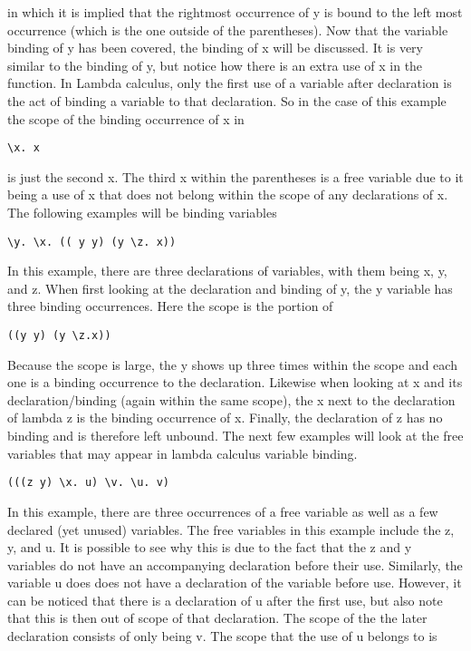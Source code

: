 \documentclass{article}
\begin{document}
in which it is implied that the rightmost occurrence of y is bound to the left most occurrence (which is the one outside of the parentheses).
Now that the variable binding of y has been covered, the binding of x will be discussed.
It is very similar to the binding of y, but notice how there is an extra use of x in the function.
In Lambda calculus, only the first use of a variable after declaration is the act of binding a variable to that declaration. So in the case of this example the scope of the binding occurrence of x in
\begin{lstlisting}
\x. x
\end{lstlisting}
is just the second x.
The third x within the parentheses is a free variable due to it being a use of x that does not belong within the scope of any declarations of x.
The following examples will be binding variables
\begin{lstlisting}
\y. \x. (( y y) (y \z. x))
\end{lstlisting}
In this example, there are three declarations of variables, with them being x, y, and z.
When first looking at the declaration and binding of y, the y variable has three binding occurrences.
Here the scope is the portion of 
\begin{lstlisting}
((y y) (y \z.x))
\end{lstlisting}
Because the scope is large, the y shows up three times within the scope and each one is a binding occurrence to the declaration.
Likewise when looking at x and its declaration/binding (again within the same scope), the x next to the declaration of lambda z is the binding occurrence of x.
Finally, the declaration of z has no binding and is therefore left unbound.
The next few examples will look at the free variables that may appear in lambda calculus variable binding.
\begin{lstlisting}
(((z y) \x. u) \v. \u. v)
\end{lstlisting}
In this example, there are three occurrences of a free variable as well as a few declared (yet unused) variables.
The free variables in this example include the z, y, and u.
It is possible to see why this is due to the fact that the z and y variables do not have an accompanying declaration before their use.
Similarly, the variable u does does not have a declaration of the variable before use.
However, it can be noticed that there is a declaration of u after the first use, but also note that this is then out of scope of that declaration.
The scope of the the later declaration consists of only being v.
The scope that the use of u belongs to is 
\end{document}
